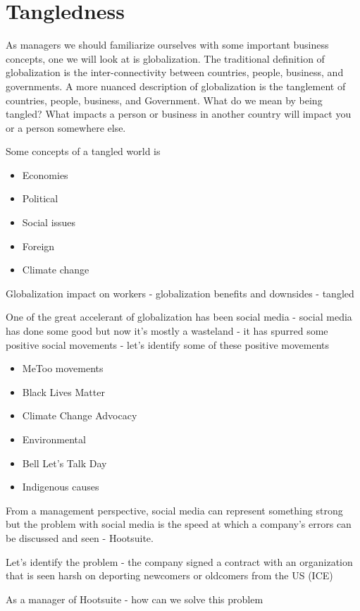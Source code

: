 \documentclass[11pt]{article}
\begin{document}
\section{Tangledness}
As managers we should familiarize ourselves with some important business concepts, one we will look at is globalization. The traditional definition of globalization is the inter-connectivity between countries, people, business, and governments. A more nuanced description of globalization is the tanglement of countries, people, business, and Government. What do we mean by being tangled? What impacts a person or business in another country will impact you or a person somewhere else.

Some concepts of a tangled world is 

\begin{itemize}
    \item Economies
    \item Political
    \item Social issues
    \item Foreign
    \item Climate change
\end{itemize}

Globalization impact on workers - globalization benefits and downsides - tangled

One of the great accelerant of globalization has been social media - social media has done some good but now it's mostly a wasteland - it has spurred some positive social movements - let's identify some of these positive movements
\begin{itemize}
    \item MeToo movements
    \item Black Lives Matter
    \item Climate Change Advocacy
    \item Environmental
    \item Bell Let's Talk Day
    \item Indigenous causes
\end{itemize}

From a management perspective, social media can represent something strong but the problem with social media is the speed at which a company's errors can be discussed and seen - Hootsuite.

Let's identify the problem - the company signed a contract with an organization that is seen harsh on deporting newcomers or oldcomers from the US (ICE)

As a manager of Hootsuite - how can we solve this problem
\end{document}
